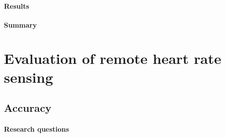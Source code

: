 \paragraph{Results}
\paragraph{Summary}



\section{Evaluation of remote heart rate sensing}
\subsection{Accuracy}

\paragraph{Research questions}

